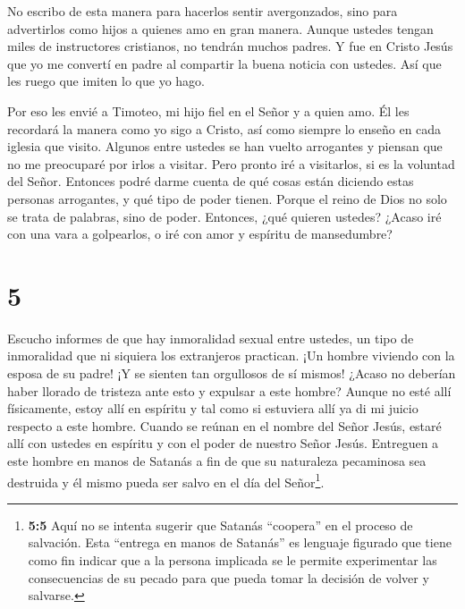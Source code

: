  No escribo de esta manera para hacerlos sentir
avergonzados, sino para advertirlos como hijos a quienes amo en gran
manera.  Aunque ustedes tengan miles de instructores
cristianos, no tendrán muchos padres. Y fue en Cristo Jesús que yo me
convertí en padre al compartir la buena noticia con ustedes.
 Así que les ruego que imiten lo que yo hago.

 Por eso les envié a Timoteo, mi hijo fiel en el Señor y a
quien amo. Él les recordará la manera como yo sigo a Cristo, así como
siempre lo enseño en cada iglesia que visito.  Algunos
entre ustedes se han vuelto arrogantes y piensan que no me preocuparé
por irlos a visitar.  Pero pronto iré a visitarlos, si es
la voluntad del Señor. Entonces podré darme cuenta de qué cosas están
diciendo estas personas arrogantes, y qué tipo de poder tienen.
 Porque el reino de Dios no solo se trata de palabras, sino
de poder.  Entonces, ¿qué quieren ustedes? ¿Acaso iré con
una vara a golpearlos, o iré con amor y espíritu de mansedumbre?

\hypertarget{section-4}{%
\section{5}\label{section-4}}

 Escucho informes de que hay inmoralidad sexual entre
ustedes, un tipo de inmoralidad que ni siquiera los extranjeros
practican. ¡Un hombre viviendo con la esposa de su padre! 
¡Y se sienten tan orgullosos de sí mismos! ¿Acaso no deberían haber
llorado de tristeza ante esto y expulsar a este hombre? 
Aunque no esté allí físicamente, estoy allí en espíritu y tal como si
estuviera allí ya di mi juicio respecto a este hombre. 
Cuando se reúnan en el nombre del Señor Jesús, estaré allí con ustedes
en espíritu y con el poder de nuestro Señor Jesús. 
Entreguen a este hombre en manos de Satanás a fin de que su naturaleza
pecaminosa sea destruida y él mismo pueda ser salvo en el día del
Señor\footnote{\textbf{5:5} Aquí no se intenta sugerir que Satanás
  ``coopera'' en el proceso de salvación. Esta ``entrega en manos de
  Satanás'' es lenguaje figurado que tiene como fin indicar que a la
  persona implicada se le permite experimentar las consecuencias de su
  pecado para que pueda tomar la decisión de volver y salvarse.}.

